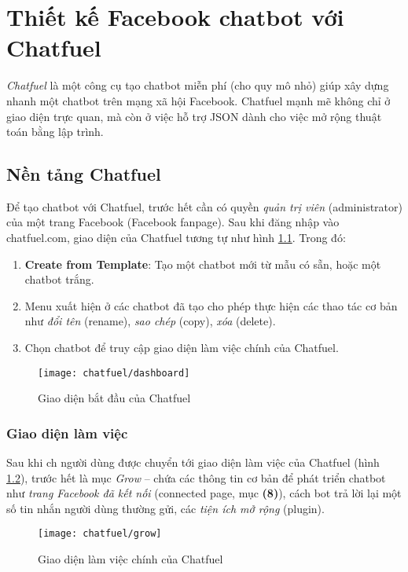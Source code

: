 \chapter{Thiết kế Facebook chatbot với Chatfuel}
\textit{Chatfuel} là một công cụ tạo chatbot miễn phí (cho quy mô nhỏ) giúp xây dựng nhanh một chatbot trên mạng xã hội Facebook. Chatfuel mạnh mẽ không chỉ ở giao diện trực quan, mà còn ở việc hỗ trợ JSON dành cho việc mở rộng thuật toán bằng lập trình.\par

\section{Nền tảng Chatfuel}
Để tạo chatbot với Chatfuel, trước hết cần có quyền \textit{quản trị viên} (administrator) của một trang Facebook (Facebook fanpage). Sau khi đăng nhập vào {\color{mTeal}chatfuel.com}, giao diện của Chatfuel tương tự như hình \ref{fig:fig-c3-dashboard}. Trong đó:
\begin{enumerate}[label=\textbf{(\arabic*)},align=left,left=0cm..0cm,itemindent=*]
	\item \textbf{Create from Template}: Tạo một chatbot mới từ mẫu có sẵn, hoặc một chatbot trắng.
	\item Menu xuất hiện ở các chatbot đã tạo cho phép thực hiện các thao tác cơ bản như \textit{đổi tên} (rename), \textit{sao chép} (copy), \textit{xóa} (delete).
	\item Chọn chatbot để truy cập giao diện làm việc chính của Chatfuel.
\end{enumerate}\par

\begin{figure}[htb!]\centering
	\texttt{[image: chatfuel/dashboard]}
	\caption{Giao diện bắt đầu của Chatfuel}
	\label{fig:fig-c3-dashboard}
\end{figure}\par

\subsection{Giao diện làm việc}
Sau khi ch người dùng được chuyển tới giao diện làm việc của Chatfuel (hình \ref{fig:fig-c3-grow}), trước hết là mục \textit{Grow} – chứa các thông tin cơ bản để phát triển chatbot như \textit{trang Facebook đã kết nối} (connected page, mục \textbf{(8)}), cách bot trả lời lại một số tin nhắn người dùng thường gửi, các \textit{tiện ích mở rộng} (plugin).\par
\begin{figure}[htb!]\centering
	\texttt{[image: chatfuel/grow]}
	\caption{Giao diện làm việc chính của Chatfuel}
	\label{fig:fig-c3-grow}
\end{figure}\par

